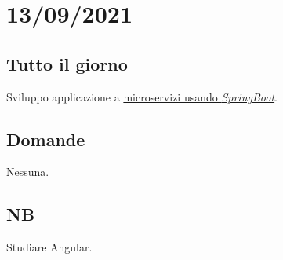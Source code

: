 \section{13/09/2021}
\subsection{Tutto il giorno}
Sviluppo applicazione a \href{https://www.youtube.com/watch?v=BnknNTN8icw&ab_channel=DailyCodeBuffer}{microservizi usando \textit{SpringBoot}}.
\subsection{Domande}
Nessuna.
\subsection{NB}
Studiare Angular.

